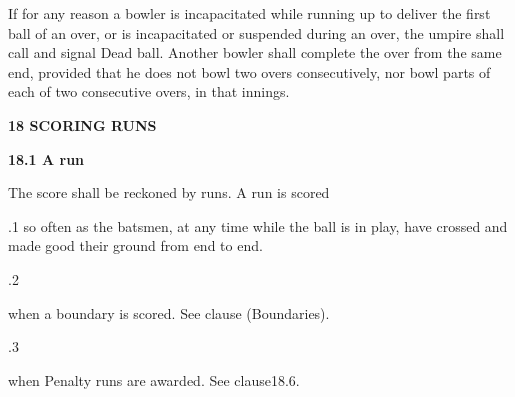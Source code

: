 \documentclass[12pt]{article}
\begin{document}
\vspace{\baselineskip}
\begin{adjustwidth}{0.0in}{0.19in}
{\fontsize{9pt}{10.8pt}\selectfont If for any reason a bowler is incapacitated while running up to deliver the first ball of an over, or is incapacitated or suspended during an over, the umpire shall call and signal Dead ball. Another bowler shall complete the over from the same end, provided that he does not bowl two overs consecutively, nor bowl parts of each of two consecutive overs, in that innings.\par}\par

\end{adjustwidth}


\vspace{\baselineskip}
{\fontsize{16pt}{19.2pt}\selectfont \textbf{18 SCORING RUNS}\par}\par


\vspace{\baselineskip}
{\fontsize{11pt}{13.2pt}\selectfont \textbf{18.1 \tabto{0.47in} A run}\par}\par


\vspace{\baselineskip}
{\fontsize{9pt}{10.8pt}\selectfont The score shall be reckoned by runs. A run is scored\par}\par


\vspace{\baselineskip}
\begin{adjustwidth}{0.5in}{0.0in}
{\fontsize{9pt}{10.8pt}.1 \tabto{0.49in} so often as the batsmen, at any time while the ball is in play, have crossed and made good their ground from end to end.\par}\par

\end{adjustwidth}


\vspace{\baselineskip}
{\fontsize{9pt}{10.8pt}.2 \tabto{0.49in} {\fontsize{8pt}{9.6pt}\selectfont when a boundary is scored. See clause (Boundaries).\par}\par}\par


\vspace{\baselineskip}
{\fontsize{9pt}{10.8pt}.3 \tabto{0.49in} {\fontsize{8pt}{9.6pt}\selectfont when Penalty runs are awarded. See clause18.6.\par}\par}\par
\end{document}
